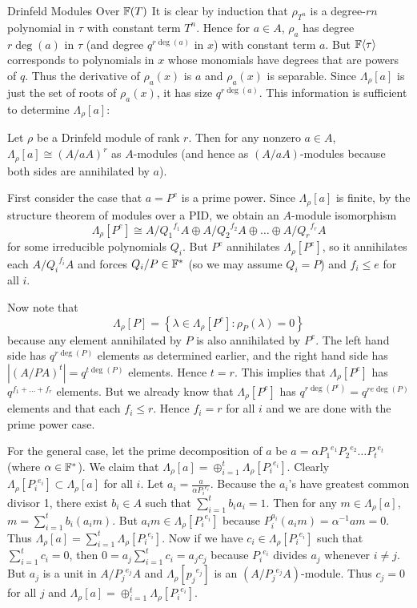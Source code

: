 \documentclass[12pt]{article}
\begin{document}
\begin{section}{Drinfeld Modules Over ${\mathbb F}(T)$}
It is clear by induction that $\rho_{T^n}$ is a degree-$rn$ polynomial in
$\tau$ with constant term $T^n$.  Hence for $a \in A$, $\rho_a$ has degree
$r\deg(a)$ in $\tau$ (and degree $q^{r\deg(a)}$ in $x$) with constant term
$a$.  But ${\mathbb F}\langle\tau\rangle$ corresponds to polynomials in $x$ whose
monomials have degrees that are powers of $q$.  Thus the derivative of
$\rho_a(x)$ is $a$ and $\rho_a(x)$ is separable.  Since $\Lambda_\rho[a]$
is just the set of roots of $\rho_a(x)$, it has size $q^{r\deg(a)}$.  This
information is sufficient to determine $\Lambda_\rho[a]$:

\begin{theorem}
Let $\rho$ be a Drinfeld module of rank $r$.  Then for any nonzero
$a \in A$, $\Lambda_\rho[a] \cong (A/aA)^r$ as $A$-modules (and hence
as $(A/aA)$-modules because both sides are annihilated by $a$).
\end{theorem}

\pf
First consider the case that $a = P^e$ is a prime power.  Since
$\Lambda_\rho[a]$ is finite, by the structure theorem of modules over a
PID, we obtain an $A$-module isomorphism
$$\Lambda_\rho[P^e] \cong A/{Q_1}^{f_1}A \oplus A/{Q_2}^{f_2}A
\oplus \ldots \oplus A/{Q_r}^{f_r}A$$ for some irreducible polynomials
$Q_i$.  But $P^e$ annihilates $\Lambda_\rho[P^e]$, so it annihilates each
$A/{Q_i}^{f_i}A$ and forces $Q_i/P \in {\mathbb F}^*$ (so we may assume $Q_i = P$)
and $f_i \leq e$ for all $i$.

Now note that $$\Lambda_\rho[P] = \left\{\lambda \in \Lambda_\rho[P^e]:
\rho_P(\lambda) = 0 \right\}$$
because any element annihilated by $P$ is also annihilated by $P^e$.  The
left hand side has $q^{r\deg(P)}$ elements as determined earlier, and the
right hand side has
$|(A/PA)^t| = q^{t\deg(P)}$ elements.  Hence $t = r$.  This implies that
$\Lambda_\rho[P^e]$ has $q^{f_1 + \ldots + f_r}$ elements.  But we already
know that $\Lambda_\rho[P^e]$ has $q^{r\deg(P^e)} = q^{re\deg(P)}$ elements
and that each $f_i \leq r$.  Hence $f_i = r$ for all $i$ and we are done
with the prime power case.

For the general case, let the prime decomposition of $a$ be $a =
\alpha{P_1}^{e_1}{P_2}^{e_2}\ldots{P_t}^{e_t}$ (where $\alpha \in {\mathbb F}^*$).
We claim that $\Lambda_\rho[a] = \oplus^t_{i=1} \Lambda_\rho[{P_i}^{e_i}]$.
Clearly $\Lambda_\rho[{P_i}^{e_i}] \subset \Lambda_\rho[a]$ for all $i$.
Let $a_i = \frac{a}{\alpha{P_i}^{e_i}}$.  Because the $a_i$'s have greatest
common divisor 1,
there exist $b_i \in A$ such that $\sum^t_{i=1} b_ia_i = 1$.
Then for any $m \in \Lambda_\rho[a]$, $m = \sum^t_{i=1} b_i(a_im)$.  But
$a_im \in \Lambda_\rho[{P_i}^{e_i}]$ because $P_i^{a_i}(a_im) =
\alpha^{-1}am = 0$.  Thus $\Lambda_\rho[a] =
\sum^t_{i=1} \Lambda_\rho[{P_i}^{e_i}]$.  Now if we have
$c_i \in \Lambda_\rho[{P_i}^{e_i}]$ such that $\sum^t_{i=1} c_i = 0$, then
$0 = a_j\sum^t_{i=1} c_i = a_jc_j$ because ${P_i}^{e_i}$ divides $a_j$
whenever $i \neq j$.  But $a_j$ is a unit in $A/{P_j}^{e_j}A$ and
$\Lambda_\rho[{p_j}^{e_j}]$ is an $(A/{P_j}^{e_j}A)$-module.  Thus
$c_j = 0$ for all $j$ and $\Lambda_\rho[a] =
\oplus^t_{i=1} \Lambda_\rho[{P_i}^{e_i}]$.


\end{section}
\end{document}
